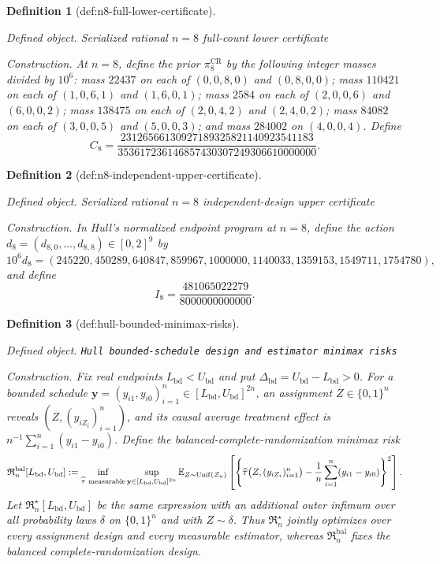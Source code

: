 \documentclass{article}
\newtheorem{definition}{Definition}
\begin{document}
\begin{definition}[def:n8-full-lower-certificate]\label{def:n8-full-lower-certificate}
\par\smallskip\noindent\emph{Defined object.} Serialized rational \(n=8\) full-count lower certificate
\par\smallskip\noindent\emph{Construction.} At \(n=8\), define the prior \(\pi_8^{\mathrm{CR}}\) by the following integer masses divided by \(10^6\): mass \(22437\) on each of \((0,0,8,0)\) and \((0,8,0,0)\); mass \(110421\) on each of \((1,0,6,1)\) and \((1,6,0,1)\); mass \(2584\) on each of \((2,0,0,6)\) and \((6,0,0,2)\); mass \(138475\) on each of \((2,0,4,2)\) and \((2,4,0,2)\); mass \(84082\) on each of \((3,0,0,5)\) and \((5,0,0,3)\); and mass \(284002\) on \((4,0,0,4)\).  Define
\[
 C_8=\frac{23126566130927189325821140923541183}
 {353617236146857430307249306610000000}.
\]
\end{definition}

\begin{definition}[def:n8-independent-upper-certificate]\label{def:n8-independent-upper-certificate}
\par\smallskip\noindent\emph{Defined object.} Serialized rational \(n=8\) independent-design upper certificate
\par\smallskip\noindent\emph{Construction.} In Hull's normalized endpoint program at \(n=8\), define the action \(d_8=(d_{8,0},\ldots,d_{8,8})\in[0,2]^9\) by
\[
 10^6d_8=(245220,450289,640847,859967,1000000,
 1140033,1359153,1549711,1754780),
\]
and define
\[
 I_8=\frac{481065022279}{8000000000000}.
\]
\end{definition}

\begin{definition}[def:hull-bounded-minimax-risks]\label{def:hull-bounded-minimax-risks}
\par\smallskip\noindent\emph{Defined object.} \texttt{Hull bounded-\allowbreak{}schedule design and estimator minimax risks}
\par\smallskip\noindent\emph{Construction.} Fix real endpoints \(L_{\mathrm{bd}}<U_{\mathrm{bd}}\) and put \(\Delta_{\mathrm{bd}}=U_{\mathrm{bd}}-L_{\mathrm{bd}}>0\).  For a bounded schedule \(\mathbf y=(y_{i1},y_{i0})_{i=1}^n\in[L_{\mathrm{bd}},U_{\mathrm{bd}}]^{2n}\), an assignment \(Z\in\{0,1\}^n\) reveals \((Z,(y_{iZ_i})_{i=1}^n)\), and its causal average treatment effect is \(n^{-1}\sum_{i=1}^n(y_{i1}-y_{i0})\).  Define the balanced-complete-randomization minimax risk
\[
 \mathfrak R_n^{\mathrm{bal}}[L_{\mathrm{bd}},U_{\mathrm{bd}}]
 :=\inf_{\widehat\tau\ {\rm measurable}}
 \sup_{\mathbf y\in[L_{\mathrm{bd}},U_{\mathrm{bd}}]^{2n}}
 \mathbb E_{Z\sim\operatorname{Unif}(\mathcal Z_n)}
 \left[\left\{\widehat\tau\bigl(Z,(y_{iZ_i})_{i=1}^n\bigr)
 -\frac1n\sum_{i=1}^n(y_{i1}-y_{i0})\right\}^2\right].
\]
Let \(\mathfrak R_n^\star[L_{\mathrm{bd}},U_{\mathrm{bd}}]\) be the same expression with an additional outer infimum over all probability laws \(\delta\) on \(\{0,1\}^n\) and with \(Z\sim\delta\).  Thus \(\mathfrak R_n^\star\) jointly optimizes over every assignment design and every measurable estimator, whereas \(\mathfrak R_n^{\mathrm{bal}}\) fixes the balanced complete-randomization design.
\end{definition}
\end{document}
